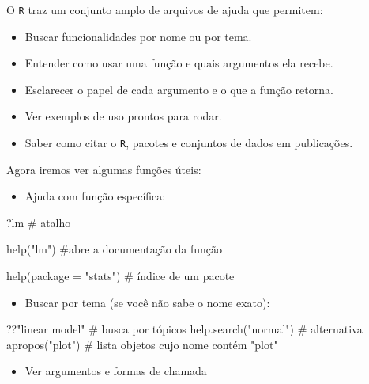 \documentclass[
  letterpaper,
  DIV=11,
  numbers=noendperiod]{scrreprt}
\newenvironment{Shaded}{\begin{snugshade}}{\end{snugshade}}
\newcommand{\AttributeTok}[1]{\textcolor[rgb]{0.40,0.45,0.13}{#1}}
\newcommand{\CommentTok}[1]{\textcolor[rgb]{0.37,0.37,0.37}{#1}}
\newcommand{\FunctionTok}[1]{\textcolor[rgb]{0.28,0.35,0.67}{#1}}
\newcommand{\NormalTok}[1]{\textcolor[rgb]{0.00,0.23,0.31}{#1}}
\newcommand{\StringTok}[1]{\textcolor[rgb]{0.13,0.47,0.30}{#1}}
\providecommand{\tightlist}{%
  \setlength{\itemsep}{0pt}\setlength{\parskip}{0pt}}\usepackage{longtable,booktabs,array}
\begin{document}
O \texttt{R} traz um conjunto amplo de arquivos de ajuda que permitem:

\begin{itemize}
\item
  Buscar funcionalidades por nome ou por tema.
\item
  Entender como usar uma função e quais argumentos ela recebe.
\item
  Esclarecer o papel de cada argumento e o que a função retorna.
\item
  Ver exemplos de uso prontos para rodar.
\item
  Saber como citar o \texttt{R}, pacotes e conjuntos de dados em
  publicações.
\end{itemize}

Agora iremos ver algumas funções úteis:

\begin{itemize}
\tightlist
\item
  Ajuda com função específica:
\end{itemize}

\begin{Shaded}
\begin{Highlighting}[]
\NormalTok{?lm }\CommentTok{\# atalho                  }

\FunctionTok{help}\NormalTok{(}\StringTok{"lm"}\NormalTok{) }\CommentTok{\#abre a documentação da função}

\FunctionTok{help}\NormalTok{(}\AttributeTok{package =} \StringTok{"stats"}\NormalTok{) }\CommentTok{\# índice de um pacote}
\end{Highlighting}
\end{Shaded}

\begin{itemize}
\tightlist
\item
  Buscar por tema (se você não sabe o nome exato):
\end{itemize}

\begin{Shaded}
\begin{Highlighting}[]
\NormalTok{??}\StringTok{"linear model"}        \CommentTok{\# busca por tópicos}
\FunctionTok{help.search}\NormalTok{(}\StringTok{"normal"}\NormalTok{)   }\CommentTok{\# alternativa}
\FunctionTok{apropos}\NormalTok{(}\StringTok{"plot"}\NormalTok{)         }\CommentTok{\# lista objetos cujo nome contém "plot"}
\end{Highlighting}
\end{Shaded}

\begin{itemize}
\tightlist
\item
  Ver argumentos e formas de chamada
\end{itemize}
\end{document}
